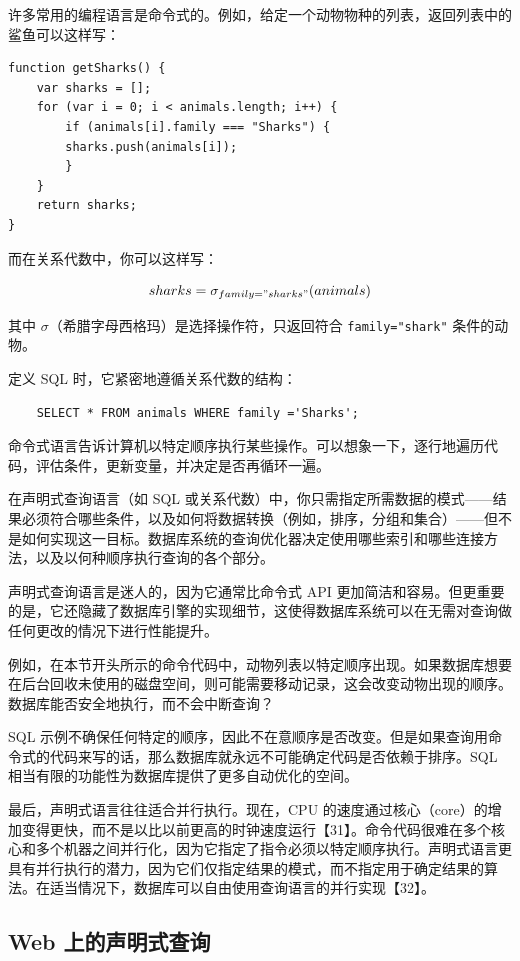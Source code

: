 许多常用的编程语言是命令式的。例如，给定一个动物物种的列表，返回列表中的鲨鱼可以这样写：

\begin{lstlisting}
function getSharks() {
    var sharks = [];
    for (var i = 0; i < animals.length; i++) {
        if (animals[i].family === "Sharks") {
        sharks.push(animals[i]);
        }
    }
    return sharks;
}
\end{lstlisting}

而在关系代数中，你可以这样写：

\[
    sharks = \sigma_{family = "sharks"}(animals)
\]

其中 $\sigma$（希腊字母西格玛）是选择操作符，只返回符合 \texttt{family="shark"} 条件的动物。

定义 SQL 时，它紧密地遵循关系代数的结构：

\begin{lstlisting}
    SELECT * FROM animals WHERE family ='Sharks';
\end{lstlisting}

命令式语言告诉计算机以特定顺序执行某些操作。可以想象一下，逐行地遍历代码，评估条件，更新变量，并决定是否再循环一遍。

在声明式查询语言（如 SQL 或关系代数）中，你只需指定所需数据的模式——结果必须符合哪些条件，以及如何将数据转换（例如，排序，分组和集合）——但不是如何实现这一目标。数据库系统的查询优化器决定使用哪些索引和哪些连接方法，以及以何种顺序执行查询的各个部分。

声明式查询语言是迷人的，因为它通常比命令式 API 更加简洁和容易。但更重要的是，它还隐藏了数据库引擎的实现细节，这使得数据库系统可以在无需对查询做任何更改的情况下进行性能提升。

例如，在本节开头所示的命令代码中，动物列表以特定顺序出现。如果数据库想要在后台回收未使用的磁盘空间，则可能需要移动记录，这会改变动物出现的顺序。数据库能否安全地执行，而不会中断查询？

SQL 示例不确保任何特定的顺序，因此不在意顺序是否改变。但是如果查询用命令式的代码来写的话，那么数据库就永远不可能确定代码是否依赖于排序。SQL 相当有限的功能性为数据库提供了更多自动优化的空间。

最后，声明式语言往往适合并行执行。现在，CPU 的速度通过核心（core）的增加变得更快，而不是以比以前更高的时钟速度运行【31】。命令代码很难在多个核心和多个机器之间并行化，因为它指定了指令必须以特定顺序执行。声明式语言更具有并行执行的潜力，因为它们仅指定结果的模式，而不指定用于确定结果的算法。在适当情况下，数据库可以自由使用查询语言的并行实现【32】。

\subsection{Web 上的声明式查询}

